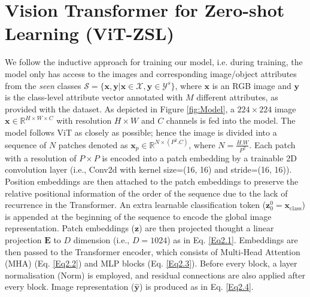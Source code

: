 \documentclass[a4paper,11pt]{article}
\newcommand{\anjan}[1]{\textcolor{red}{Anjan: #1}}
\begin{document}
\section{Vision Transformer for Zero-shot Learning (ViT-ZSL)}
\label{ProposedModel}
We follow the inductive approach for training our model, i.e. during training, the model only has access to the images and corresponding image/object attributes from the \emph{seen} classes \(\mathcal{S}= \{\mathbf{x}, \mathbf{y} | \mathbf{x}\in \mathcal{X}, \mathbf{y} \in \mathcal{Y}^s \}\), where $\mathbf{x}$ is an RGB image and $\mathbf{y}$ is the class-level attribute vector annotated with $M$ different attributes, as provided with the dataset. As depicted in Figure \ref{fig:Model}, a $224 \times 224$ image $\mathbf{x} \in \mathbb{R}^{H \times W \times C}$ with resolution $H \times W$ and $C$ channels is fed into the model. The model follows ViT \cite{ViT} as closely as possible; hence the image is divided into a sequence of $N$ patches denoted as $\mathbf{x}_p \in \mathbb{R}^{N \times (P^2.C)}$, where \(N = \frac{H.W}{P^2}\). Each patch with a resolution of $ P \times P$ is encoded into a patch embedding by a trainable 2D convolution layer (i.e., Conv2d with kernel size=(16, 16) and stride=(16, 16)). Position embeddings are then attached to the patch embeddings to preserve the relative positional information of the order of the sequence due to the lack of recurrence in the Transformer. An extra learnable classification token ($\mathbf{z}^0_0 = \mathbf{x}_\text{class}$) is appended at the beginning of the sequence to encode the global image representation. Patch embeddings ($\mathbf{z}$) are then projected thought a linear projection $\mathbf{E}$ to $D$ dimension (i.e., $D=1024$) as in Eq. \ref{Eq2.1}. Embeddings are then passed to the Transformer encoder, which consists of Multi-Head Attention (MHA) (Eq. \ref{Eq2.2}) and MLP blocks (Eq. \ref{Eq2.3}). Before every block, a layer normalisation (Norm) is employed, and residual connections are also applied after every block. Image representation ($\mathbf{\hat{y}}$) is produced as in Eq. \ref{Eq2.4}.
\end{document}
